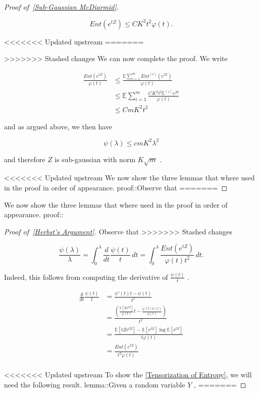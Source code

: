 \documentclass{article}
\begin{document}
\begin{proof}[Proof of~{\autoref{Sub-Gaussian McDiarmid}}]
\begin{lemma}
\begin{equation*}
Ent(e^{tZ}) \leq CK^2 t^2 \varphi(t).
\end{equation*}

<<<<<<< Updated upstream
=======

\end{lemma}
>>>>>>> Stashed changes
 We can now complete the proof. We write


\begin{align*}
\frac{Ent(e^{tZ})}{\varphi(t)} &\leq \frac{\mathbb{E}\sum_{i=1}^m Ent^{(i)}(e^{tZ})}{\varphi(t)}\\
& \leq \mathbb{E} \sum_{i=1}^m \frac{CK^2t^2\mathbb{E}^{(i)}e^{Zt}}{\varphi(t)} \\
& \leq CmK^2 t^2
\end{align*}

and as argued above, we then have


\begin{equation*}
\psi(\lambda) \leq c m K^2 \lambda^2
\end{equation*}

and therefore  $Z$  is sub-gaussian with norm  $K \sqrt{ m }$ .

<<<<<<< Updated upstream
 We now show the three lemmas that where used in the proof in order of appearance. proof::Observe that
=======

\end{proof}

We now show the three lemmas that where used in the proof in order of appearance.
proof::
\begin{proof}[Proof of~{\autoref{Herbst's Argument}}]
\label{proof:Herbst's Argument}
Observe that
>>>>>>> Stashed changes


\begin{equation*}
\frac{\psi(\lambda)}{\lambda} = \int_0^\lambda \frac{d}{dt} \frac{\psi(t)}{t} \, dt = \int_0^\lambda  \frac{Ent(e^{tZ})}{\varphi(t)t^2}  \, dt.
\end{equation*}

Indeed, this follows from computing the derivative of  $\frac{\psi(t)}{t}$ .


\begin{align*}
\frac{d}{dt} \frac{\psi(t)}{t} &= \frac{\psi'(t)t - \psi(t)}{t^2}\\
&= \frac{\left( \frac{\mathbb{E}[Ze^{tZ}]}{\varphi(t)}t - \frac{\varphi(t)\psi(t)}{\varphi(t)} \right)}{t^2}\\
&= \frac{\mathbb{E}[tZe^{tZ}] - \mathbb{E}[e^{tZ}] \log \mathbb{E}[e^{tZ}]}{t\varphi(t)} \\
&= \frac{Ent(e^{tZ})}{t^2 \varphi(t)}\\
\end{align*}

<<<<<<< Updated upstream
 To show the \autoref{Tensorization of Entropy}, we will need the following result. lemma::Given a random variable  $Y$ ,
=======

\end{proof}
\end{document}
